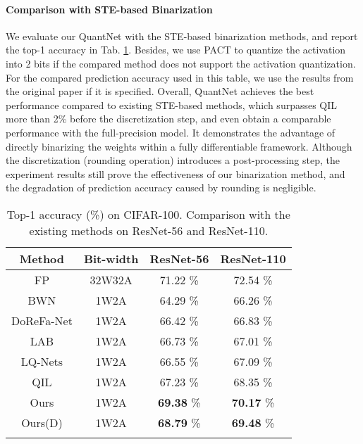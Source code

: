 \documentclass[runningheads]{llncs}
\begin{document}
\paragraph{\textbf{Comparison with STE-based Binarization}}
We evaluate our QuantNet with the STE-based binarization methods,
and report the top-1 accuracy in Tab. \ref{tab:comp_cifar}.
Besides, we use PACT \cite{pact2018} to quantize the activation into 2 bits
if the compared method does not support the activation quantization.
For the compared prediction accuracy used in this table,
we use the results from the original paper if it is specified.
Overall, QuantNet achieves the best performance compared to existing STE-based methods,
which surpasses QIL \cite{jung2019learning} more than 2\% before the discretization step,
and even obtain a comparable performance with the full-precision model.
It demonstrates the advantage of directly binarizing the weights within a fully differentiable framework.
Although the discretization (rounding operation) introduces a post-processing step,
the experiment results still prove the effectiveness of our binarization method,
and the degradation of prediction accuracy caused by rounding is negligible.

\begin{table}[htb]
\begin{center}
\begin{tabular}{cccc}
    \hline
    Method & Bit-width & ResNet-56 & ResNet-110    \\
    \hline
    FP                                      &32W32A & 71.22 \% & 72.54 \%   \\
    BWN \cite{courbariaux2015binaryconnect} &1W2A   & 64.29 \% & 66.26 \%   \\
    DoReFa-Net \cite{Zhou2016DoReFa}        &1W2A   & 66.42 \% & 66.83 \%   \\
    LAB \cite{hou2016loss}                  &1W2A   & 66.73 \% & 67.01 \%   \\
    LQ-Nets \cite{Zhang2018LQ}              &1W2A   & 66.55 \% & 67.09 \%   \\
    QIL \cite{jung2019learning}             &1W2A   & 67.23 \% & 68.35 \%   \\
    Ours                                    &1W2A   & \textbf{69.38} \% & \textbf{70.17} \%  \\
    Ours(D)                                 &1W2A   & \textbf{68.79} \% & \textbf{69.48} \%  \\
    \hline
    \noalign{\smallskip}
    \end{tabular}
    \caption{Top-1 accuracy (\%) on CIFAR-100. Comparison with the existing methods on ResNet-56 and ResNet-110.}
    \label{tab:comp_cifar}
\end{center}
\end{table}
\end{document}
